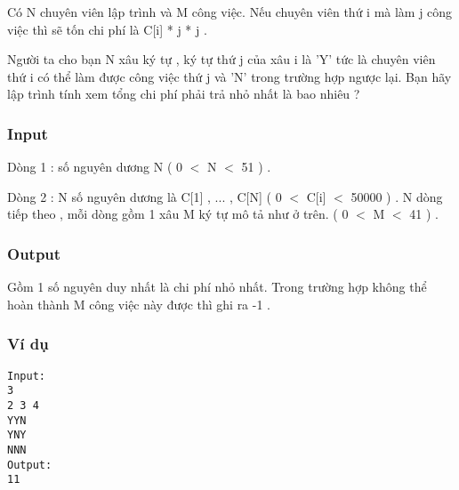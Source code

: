 



   Có N chuyên viên lập trình và M công việc. Nếu chuyên viên thứ i mà làm j công việc thì sẽ tốn chi phí là C[i] * j * j .   


   Người ta cho bạn N xâu ký tự , ký tự thứ j của xâu i là 'Y' tức là chuyên viên thứ i có thể làm được công việc thứ j và 'N' trong trường hợp ngược lại. Bạn hãy lập trình tính xem tổng chi phí phải trả nhỏ nhất là bao nhiêu ?  

\subsubsection{   Input  }

   Dòng 1 : số nguyên dương N ( 0 $<$ N $<$ 51 ) .   


   Dòng 2 : N số nguyên dương là C[1] , ... , C[N] ( 0 $<$ C[i] $<$ 50000 ) . N dòng tiếp theo , mỗi dòng gồm 1 xâu M ký tự mô tả như ở trên. ( 0 $<$ M $<$ 41 ) .  

\subsubsection{   Output  }

   Gồm 1 số nguyên duy nhất là chi phí nhỏ nhất. Trong trường hợp không thể hoàn thành M công việc này được thì ghi ra -1 .  

\subsubsection{   Ví dụ  }
\begin{verbatim}
Input:
3
2 3 4
YYN
YNY
NNN
Output:
11
\end{verbatim}
